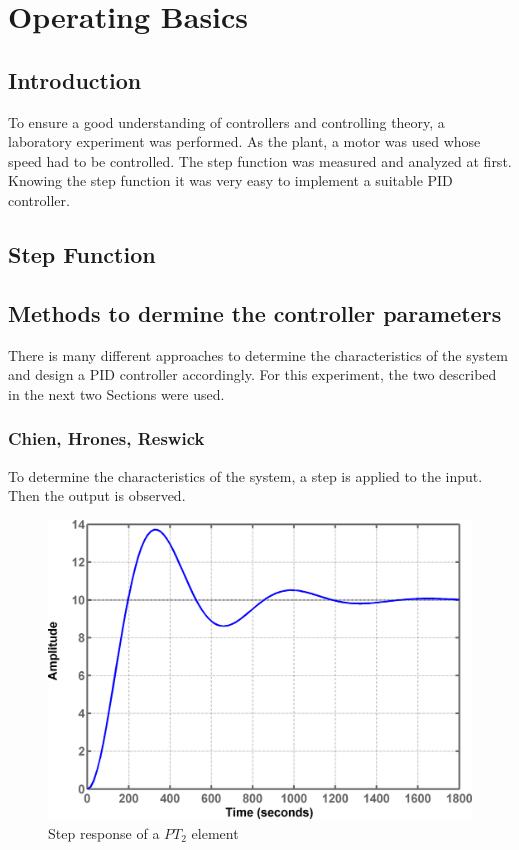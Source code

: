\section{Operating Basics}

\subsection{Introduction}

To ensure a good understanding of controllers and controlling theory, a laboratory experiment was performed. As the plant, a motor was used whose speed had to be controlled.
The step function was measured and analyzed at first. Knowing the step function it was very easy to implement a suitable PID controller.

\subsection{Step Function}



\subsection{Methods to dermine the controller parameters}

There is many different approaches to determine the characteristics of the system and design a PID controller accordingly. For this experiment, the two described in the next two Sections were used.

\subsubsection{Chien, Hrones, Reswick}
\label{subs:Chien, Hrones, Reswick}

To determine the characteristics of the system, a step is applied to the input. Then the output is observed.

\begin{figure}[H]
\begin{center}
\includegraphics[width=0.6\linewidth]{images/general/step_pt2}
\end{center}
\caption{Step response of a $PT_2$ element}
\label{fig:step_pt2}
\end{figure}

